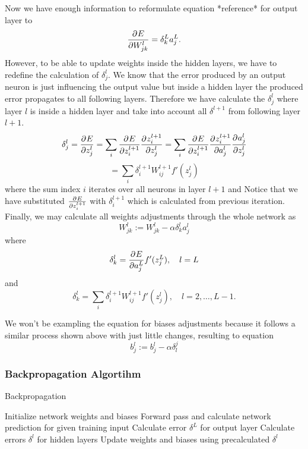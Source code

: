 Now we have enough information to reformulate equation *reference* for output layer to
\[ \frac{\partial^{} E}{\partial W_{jk}^l} = \delta_k^{L}a_j^L. \]
However, to be able to update weights inside the hidden layers, we have to redefine the calculation of $\delta_j^l$.
We know that the error produced by an output neuron is just influencing the output value but inside a hidden layer the produced error propagates to all following layers.
Therefore we have calculate the $\delta_j^l$ where layer $l$ is inside a hidden layer and take into account all $\delta^{l+1}$ from following layer $l+1$.
\[  \delta_j^l =  \frac{\partial^{} E}{\partial z_j^l} = \sum_i\frac{\partial^{} E}{\partial z_i^{l+1}}\frac{\partial^{} z_i^{l+1}}{\partial z_j^{l}} = \sum_i\frac{\partial^{} E}{\partial z_i^{l+1}}\frac{\partial^{} z_i^{l+1}}{\partial a_j^{l}}\frac{\partial^{} a_j^l}{\partial z_j^l} \]
\[  = \sum_i\delta_i^{l+1}W_{ij}^{l+1}f'(z_j^l) \]
where the sum index $i$ iterates over all neurons in layer $l+1$ and Notice that we have substituted $\frac{\partial^{} E}{\partial z_i^{l+1}}$ with $\delta_i^{l+1}$ which is calculated from previous iteration.
\newline
Finally, we may calculate all weights adjustments through the whole network as
\[  W_{jk}^l := W_{jk}^l - \alpha\delta_k^{l}a_j^l \]
where
\[ \delta_k^{l} = \frac{\partial^{} E}{\partial a_j^L}f'(z_j^L), \quad l = L \]
and
\[ \delta_k^{l} = \sum_i\delta_i^{l+1}W_{ij}^{l+1}f'(z_j^l), \quad l = 2,\ldots, L-1. \]

We won't be exampling the equation for biases adjustments because it follows a similar process shown above with just little changes, resulting to equation
\[  b_{j}^l := b_{j}^l - \alpha\delta_l^{j} \]

\clearpage

\subsubsection{Backpropagation Algortihm}

\begin{algorithm}
\caption{Backpropagation}\label{euclid}
\begin{algorithmic}[1]
\State Initialize network weights and biases
	\State Forward pass and calculate network prediction for given training input
	\State Calculate error $\delta^L$ for output layer
	\State Calculate errors $\delta^l$ for hidden layers
	\State Update weights and biases using precalculated $\delta^l$
\EndFor
\end{algorithmic}
\end{algorithm}
